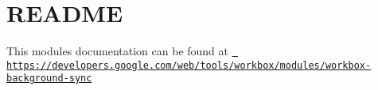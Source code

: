 \chapter{README}
\hypertarget{md_node__modules_2workbox-background-sync_2README}{}\label{md_node__modules_2workbox-background-sync_2README}
This module\textquotesingle{}s documentation can be found at \href{https://developers.google.com/web/tools/workbox/modules/workbox-background-sync}{\texttt{ https\+://developers.\+google.\+com/web/tools/workbox/modules/workbox-\/background-\/sync}} 
